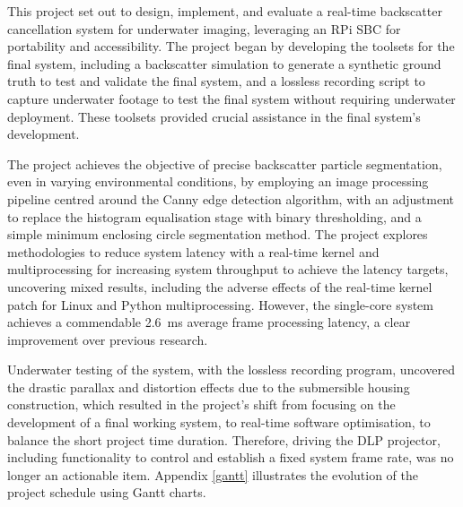 This project set out to design, implement, and evaluate a real-time backscatter cancellation system for underwater imaging, leveraging an RPi SBC for portability and accessibility. The project began by developing the toolsets for the final system, including a backscatter simulation to generate a synthetic ground truth to test and validate the final system, and a lossless recording script to capture underwater footage to test the final system without requiring underwater deployment. These toolsets provided crucial assistance in the final system's development.

The project achieves the objective of precise backscatter particle segmentation, even in varying environmental conditions, by employing an image processing pipeline centred around the Canny edge detection algorithm, with an adjustment to replace the histogram equalisation stage with binary thresholding, and a simple minimum enclosing circle segmentation method. The project explores methodologies to reduce system latency with a real-time kernel and multiprocessing for increasing system throughput to achieve the latency targets, uncovering mixed results, including the adverse effects of the real-time kernel patch for Linux and Python multiprocessing. However, the single-core system achieves a commendable \SI{2.6}{\milli\second} average frame processing latency, a clear improvement over previous research.

Underwater testing of the system, with the lossless recording program, uncovered the drastic parallax and distortion effects due to the submersible housing construction, which resulted in the project's shift from focusing on the development of a final working system, to real-time software optimisation, to balance the short project time duration. Therefore, driving the DLP projector, including functionality to control and establish a fixed system frame rate, was no longer an actionable item. Appendix \ref{gantt} illustrates the evolution of the project schedule using Gantt charts.

